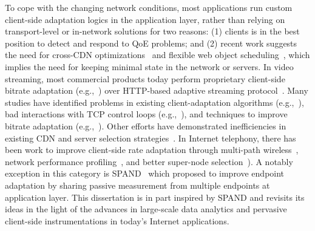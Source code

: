 To cope with the changing network conditions, 
most applications run custom client-side adaptation logics in
the application layer, rather than relying on transport-level or 
in-network solutions for two reasons:
(1) clients is in the best position to detect and respond to 
QoE problems; and 
(2) recent work suggests the need for cross-CDN 
optimizations~\cite{sigcomm12} and 
flexible web object scheduling~\cite{butkiewicz2015klotski},
which implies the need for keeping minimal state in the
network or servers.
In video streaming, most commercial products 
today perform proprietary client-side bitrate adaptation 
(e.g.,~\cite{SmoothStreaming,akamaihd,hls,netflix}) 
over HTTP-based adaptive streaming 
protocol~\cite{dash}.
Many studies have identified problems in existing
client-adaptation algorithms 
(e.g.,~\cite{mmsys2011cisco,de2010experimental}),
bad interactions with TCP control loops
(e.g.,~\cite{confused,usenix12_ghobadi}),
and techniques to improve bitrate adaptation 
(e.g.,~\cite{nossdav12_akhshabi,festive,panda}). 
Other efforts have demonstrated inefficiencies in existing 
CDN and server selection
strategies~\cite{youtubecdn,youtube-infra,sigcomm12,sigcomm12cdnmulti}.
In Internet telephony, there has been work to improve 
client-side rate adaptation through multi-path wireless~\cite{diversifi},
network performance profiling~\cite{sprout,de2008skype}, and 
better super-node selection~\cite{baset2004analysis,Skype-GI08}).
A notably exception in this category is SPAND~\cite{spand}
which proposed to improve endpoint adaptation
by sharing passive measurement from multiple endpoints 
at application layer.
This dissertation is in part inspired by SPAND and revisits
its ideas in the light of the advances in large-scale data analytics
and pervasive client-side instrumentations in today's Internet 
applications.


